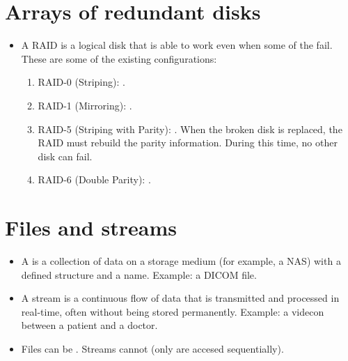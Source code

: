 \section{Arrays of redundant disks}
\begin{itemize}
\item A \gls{RAID} is a logical disk that is able to work even when some of the  fail. These are some of the existing configurations:
  \begin{enumerate}
  \item RAID-0 (Striping): .
  \item RAID-1 (Mirroring): .
  \item RAID-5 (Striping with Parity): . When the broken disk is replaced, the RAID must rebuild the parity information. During this time, no other disk can fail.
  \item RAID-6 (Double Parity): .
  \end{enumerate}
\end{itemize}

\section{Files and streams}
\begin{itemize}
\item A  is a collection of data  on a storage
medium (for example, a NAS) with a defined structure and a
name. Example: a DICOM file.
\item A stream is a continuous flow of data that is transmitted and
processed in real-time, often without being stored
permanently. Example: a videcon between a patient and a doctor.
\item Files can be . Streams cannot (only are accesed
sequentially).
\end{itemize}

